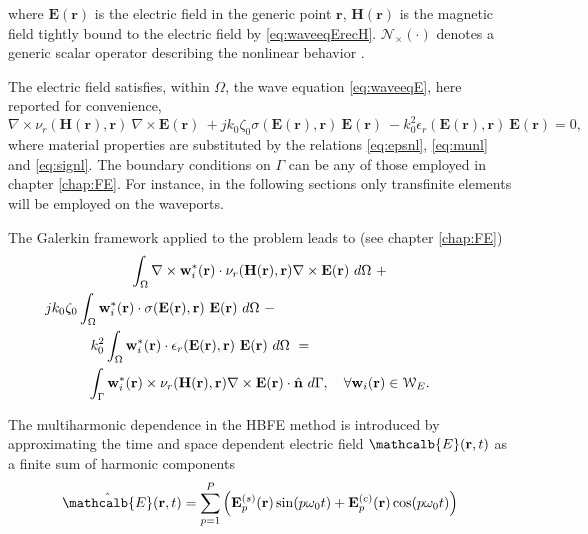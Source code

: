 \noindent where $\mathbf{E}(\mathbf{r})$ is the electric field in the generic point
$\mathbf{r}$, $\mathbf{H}(\mathbf{r})$ is the magnetic field tightly bound to the electric field by \eqref{eq:waveeqErecH}. $\mathcal{N}_\times(\cdot)$ denotes a generic scalar operator describing the nonlinear behavior \cite{Guarnieri2010}. 

The electric field satisfies, within $\Omega$, the wave equation \eqref{eq:waveeqE}, here reported for convenience,
\begin{equation}
\nabla \times \nu_r(\mathbf{H}(\mathbf{r}),\mathbf{r}) \ \nabla \times {\mathbf{E}(\mathbf{r})} \ + j k_0 \zeta_0 \sigma(\mathbf{E}(\mathbf{r}),\mathbf{r}) \ {\mathbf{E}(\mathbf{r})} \ - k_0^2 \epsilon_r(\mathbf{E}(\mathbf{r}),\mathbf{r}) \ {\mathbf{E}(\mathbf{r})} = 0,\label{eq:waveeqEnl}
\end{equation}
\noindent where material properties are substituted by the relations \eqref{eq:epsnl}, \eqref{eq:munl} and \eqref{eq:signl}. The boundary conditions on $\Gamma$ can be any of those employed in chapter \ref{chap:FE}. For instance, in the following sections only transfinite elements will be employed on the waveports.

The Galerkin framework applied to the problem leads to (see chapter \ref{chap:FE}) 
%
\begin{multline}
\label{eq:FEMformnl}
\int_\Omega \nabla \times \mathbf{w}_i^*(\mathbf{r}) \cdot \nu_r(\mathbf{H}(\mathbf{r}),\mathbf{r}) \nabla \times \mathbf{E}(\mathbf{r}) \ d\Omega \ + \\
 \hspace{-5cm} j k_0 \zeta_0 \int_\Omega \mathbf{w}_i^*(\mathbf{r}) \cdot \sigma(\mathbf{E}(\mathbf{r}),\mathbf{r}) \ \mathbf{E}(\mathbf{r}) \ d\Omega \ - \\
 \hspace{-3cm} k_0^2 \int_\Omega \mathbf{w}_i^*(\mathbf{r}) \cdot \epsilon_r(\mathbf{E}(\mathbf{r}),\mathbf{r}) \ \mathbf{E}(\mathbf{r}) \ d\Omega \ = \\
\int_{\Gamma} \mathbf{w}_i^*(\mathbf{r})  \times \nu_r(\mathbf{H}(\mathbf{r}),\mathbf{r}) \nabla \times {\mathbf{E}}(\mathbf{r}) \cdot \hat{\mathbf{n}} \ d\Gamma, 
\quad \forall \mathbf{w}_i(\mathbf{r}) \in \mathcal{W}_E.
\end{multline}

The multiharmonic dependence in the HBFE method is introduced by approximating the time and space dependent electric field $\mathcalb{E}(\mathbf{r},t)$ as a finite sum of harmonic components \cite{bachinger2005numerical}
%
\begin{equation} \label{eq:field}
\hat{\mathcalb{E}}(\mathbf{r}, t) = \sum^P_{p=1} \left( \mathbf{E}_{p}^{(s)}(\mathbf{r}) \sin(p
\omega_0 t) + \mathbf{E}_p^{(c)}(\mathbf{r}) \cos(p \omega_0 t) \right)
\end{equation} 


